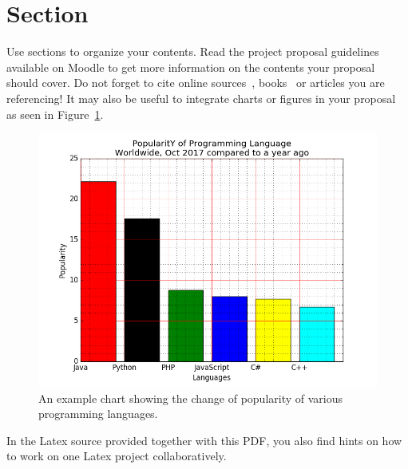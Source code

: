 \documentclass[
     12pt,         %
     a4paper,      %
     BCOR10mm,     %
     DIV14,        %
     ]{article}
\begin{document}
\section{Section}

Use sections to organize your contents. Read the project proposal guidelines available on Moodle to get more information on the contents your proposal should cover. Do not forget to cite online sources~\cite{WFR2017}, books~\cite{goldberg2017neural} or articles you are referencing! It may also be useful to integrate charts or figures in your proposal as seen in Figure~\ref{fig:example}.

\begin{figure}[h]
  \centering
  \includegraphics[scale=0.3]{figures/example_barchart}
  \caption[]{An example chart showing the change of popularity of various programming languages\footnotemark[1].}
  \label{fig:example}
\end{figure}


In the Latex source provided together with this PDF, you also find hints on how to work on one Latex project collaboratively.




%
%
%
\end{document}
